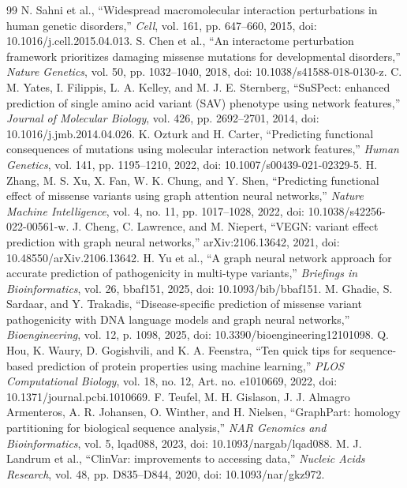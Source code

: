 \documentclass[conference]{IEEEtran}
\begin{document}
\begin{thebibliography}{99}
 N. Sahni et al., ``Widespread macromolecular interaction perturbations in human genetic disorders,'' \emph{Cell}, vol. 161, pp. 647--660, 2015, doi: 10.1016/j.cell.2015.04.013.
 S. Chen et al., ``An interactome perturbation framework prioritizes damaging missense mutations for developmental disorders,'' \emph{Nature Genetics}, vol. 50, pp. 1032--1040, 2018, doi: 10.1038/s41588-018-0130-z.
 C. M. Yates, I. Filippis, L. A. Kelley, and M. J. E. Sternberg, ``SuSPect: enhanced prediction of single amino acid variant (SAV) phenotype using network features,'' \emph{Journal of Molecular Biology}, vol. 426, pp. 2692--2701, 2014, doi: 10.1016/j.jmb.2014.04.026.
 K. Ozturk and H. Carter, ``Predicting functional consequences of mutations using molecular interaction network features,'' \emph{Human Genetics}, vol. 141, pp. 1195--1210, 2022, doi: 10.1007/s00439-021-02329-5.
 H. Zhang, M. S. Xu, X. Fan, W. K. Chung, and Y. Shen, ``Predicting functional effect of missense variants using graph attention neural networks,'' \emph{Nature Machine Intelligence}, vol. 4, no. 11, pp. 1017--1028, 2022, doi: 10.1038/s42256-022-00561-w.
 J. Cheng, C. Lawrence, and M. Niepert, ``VEGN: variant effect prediction with graph neural networks,'' arXiv:2106.13642, 2021, doi: 10.48550/arXiv.2106.13642.
 H. Yu et al., ``A graph neural network approach for accurate prediction of pathogenicity in multi-type variants,'' \emph{Briefings in Bioinformatics}, vol. 26, bbaf151, 2025, doi: 10.1093/bib/bbaf151.
 M. Ghadie, S. Sardaar, and Y. Trakadis, ``Disease-specific prediction of missense variant pathogenicity with DNA language models and graph neural networks,'' \emph{Bioengineering}, vol. 12, p. 1098, 2025, doi: 10.3390/bioengineering12101098.
 Q. Hou, K. Waury, D. Gogishvili, and K. A. Feenstra, ``Ten quick tips for sequence-based prediction of protein properties using machine learning,'' \emph{PLOS Computational Biology}, vol. 18, no. 12, Art. no. e1010669, 2022, doi: 10.1371/journal.pcbi.1010669.
 F. Teufel, M. H. Gislason, J. J. Almagro Armenteros, A. R. Johansen, O. Winther, and H. Nielsen, ``GraphPart: homology partitioning for biological sequence analysis,'' \emph{NAR Genomics and Bioinformatics}, vol. 5, lqad088, 2023, doi: 10.1093/nargab/lqad088.
 M. J. Landrum et al., ``ClinVar: improvements to accessing data,'' \emph{Nucleic Acids Research}, vol. 48, pp. D835--D844, 2020, doi: 10.1093/nar/gkz972.

\end{thebibliography}
\end{document}
